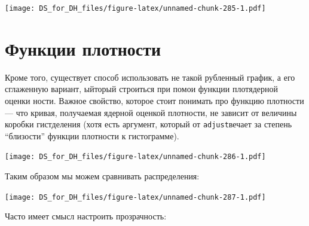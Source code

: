 \documentclass[
]{book}
\newenvironment{Shaded}{\begin{snugshade}}{\end{snugshade}}
\newcommand{\CommentTok}[1]{\textcolor[rgb]{0.56,0.35,0.01}{\textit{#1}}}
\newcommand{\DataTypeTok}[1]{\textcolor[rgb]{0.13,0.29,0.53}{#1}}
\newcommand{\FloatTok}[1]{\textcolor[rgb]{0.00,0.00,0.81}{#1}}
\newcommand{\KeywordTok}[1]{\textcolor[rgb]{0.13,0.29,0.53}{\textbf{#1}}}
\newcommand{\NormalTok}[1]{#1}
\newcommand{\OperatorTok}[1]{\textcolor[rgb]{0.81,0.36,0.00}{\textbf{#1}}}
\newcommand{\StringTok}[1]{\textcolor[rgb]{0.31,0.60,0.02}{#1}}
\begin{document}
\texttt{[image: DS\_for\_DH\_files/figure-latex/unnamed-chunk-285-1.pdf]}

\hypertarget{ux444ux443ux43dux43aux446ux438ux438-ux43fux43bux43eux442ux43dux43eux441ux442ux438}{%
\section{Функции плотности}\label{ux444ux443ux43dux43aux446ux438ux438-ux43fux43bux43eux442ux43dux43eux441ux442ux438}}

Кроме того, существует способ использовать не такой рубленный график, а его сглаженную вариант, ыйторый строиться при помои функции плотядерной оценки ности. Важное свойство, которое стоит понимать про функцию плотности --- что кривая, получаемая ядерной оценкой плотности, не зависит от величины коробки гистделения (хотя есть аргумент, который от \texttt{adjust}вечает за степень ``близости'' функции плотности к гистограмме).

\begin{Shaded}
\end{Shaded}

\texttt{[image: DS\_for\_DH\_files/figure-latex/unnamed-chunk-286-1.pdf]}

Таким образом мы можем сравнивать распределения:

\begin{Shaded}
\end{Shaded}

\texttt{[image: DS\_for\_DH\_files/figure-latex/unnamed-chunk-287-1.pdf]}

Часто имеет смысл настроить прозрачность:

\begin{Shaded}
\end{Shaded}
\end{document}
